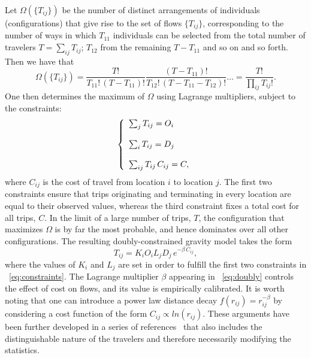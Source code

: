 Let $\Omega(\{T_{ij}\})$ be the number of distinct arrangements of individuals (configurations) that give rise to the set of flows $\{T_{ij}\}$, 
corresponding to the number of ways in which $T_{11}$ individuals can be selected from the total number of travelers $T = \sum_{ij} T_{ij}$; $T_{12}$ from the remaining $T - T_{11}$ and so on and so forth.   
Then we have that 
%
\begin{equation} 
		\Omega(\{T_{ij}\}) = 
\frac{T !}{T_{11}! \, (T - T_{11})!} \frac{(T - T_{11})!}{T_{12}! \, (T - T_{11} - T_{12})!} \dots = 
\frac{T !}{\prod_{ij} T_{ij}!} .
\label{eq:omega}
\end{equation}  
%
One then determines the maximum of $\Omega$ using Lagrange multipliers, subject to the constraints: 
%
\begin{equation}
 \label{eq:constraints}
  \left\{ 
    \begin{array}{l}  
        \sum_j T_{ij}=O_i\\					
				$\,$ \\	
				\sum_i T_{ij}=D_j  \\ 
        $\,$ \\	
			\sum_{ij} T_{ij}\, C_{ij}=C, \\ 
    \end{array} 
	\right.
\end{equation}
where $C_{ij}$ is the cost of travel from location $i$ to location $j$. The first two constraints ensure that trips originating and terminating in every location are equal to their observed values, whereas the third constraint fixes a total cost for all trips, $C$. 
In the limit of a large number of trips, $T$, the configuration that maximizes $\Omega$ is by far the most probable, and hence dominates over all other configurations. 
The resulting doubly-constrained gravity model takes the form
%
\begin{equation}
    T_{ij}=K_i O_i  L_j D_j \, e^{-\beta \, C_{ij}} ,
		\label{eq:doubly}
\end{equation}  
%
where the values of $K_i$ and $L_j$ are set in order to fulfill the first two constraints in \equationname~\eqref{eq:constraints}.
The Lagrange multiplier $\beta$ appearing in \equationname~\eqref{eq:doubly} controls the effect of cost on flows, and its value is empirically calibrated. It is worth noting that one can introduce a power law distance decay $f(r_{ij}) = r_{ij}^{- \beta}$ by considering a cost function of the form $C_{ij} \propto ln(r_{ij})$. These arguments have been further developed in a series of references~\cite{sagarra_2013_statistical,sagarra_2015_role} that also includes the distinguishable nature of the travelers and therefore necessarily modifying the statistics.\\


